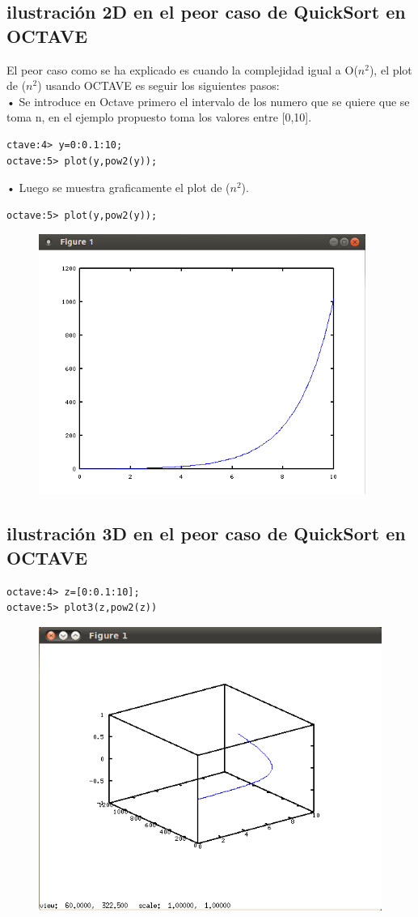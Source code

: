 \documentclass[a4,12pt]{article}
\begin{document}
\subsection{ilustración 2D en el peor caso de QuickSort en OCTAVE}
El peor caso como se ha explicado es cuando la complejidad igual a O($n^2$), el plot de ($n^2$) usando OCTAVE es seguir los siguientes pasos:\\
• Se introduce en Octave primero el intervalo de los numero que se quiere que se toma n, en el ejemplo propuesto toma los valores entre [0,10].\\

\begin{verbatim}
ctave:4> y=0:0.1:10;
octave:5> plot(y,pow2(y));
\end{verbatim}

• Luego se muestra graficamente el plot de ($n^2$).\\
\begin{verbatim}
octave:5> plot(y,pow2(y));
\end{verbatim}
\begin{figure}[H]
  \centering
    \includegraphics{imagenes/plot2}
\end{figure}

\subsection{ilustración 3D en el peor caso de QuickSort en OCTAVE}
\begin{verbatim}
octave:4> z=[0:0.1:10];
octave:5> plot3(z,pow2(z))
\end{verbatim}
\begin{figure}[H]
  \centering
    \includegraphics{imagenes/plot3}
\end{figure}
\end{document}
